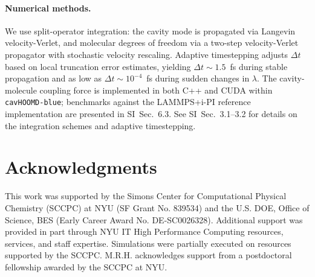 \documentclass[aps, prl,
 reprint,
 superscriptaddress,
 citeautoscript,
 amsmath,amssymb,
 tightenlines
]{revtex4-2}
\begin{document}
\paragraph*{Numerical methods.}
We use split-operator integration: the cavity mode is propagated via Langevin velocity-Verlet, and molecular degrees of freedom via a two-step velocity-Verlet propagator with stochastic velocity rescaling.\cite{bussi2007canonical,bussi2008stochastic}
Adaptive timestepping adjusts $\Delta t$ based on local truncation error estimates, yielding $\Delta t \sim 1.5$~fs during stable propagation and as low as $\Delta t \sim 10^{-4}$~fs during sudden changes in $\lambda$.
The cavity-molecule coupling force is implemented in both C++ and CUDA within \texttt{cavHOOMD-blue}; benchmarks against the LAMMPS+i-PI reference implementation\cite{li2020cavity,li2021cavity} are presented in SI~Sec.~6.3.
See SI~Sec.~3.1--3.2 for details on the integration schemes and adaptive timestepping.

\section*{Acknowledgments}

This work was supported by the Simons Center for Computational Physical Chemistry (SCCPC) at NYU (SF Grant No. 839534) and the U.S. DOE, Office of Science, BES (Early Career Award No. DE-SC0026328). Additional support was provided in part through NYU IT High Performance Computing resources, services, and staff expertise. Simulations were partially executed on resources supported by the SCCPC. M.R.H. acknowledges support from a postdoctoral fellowship awarded by the SCCPC at NYU.


\end{document}
